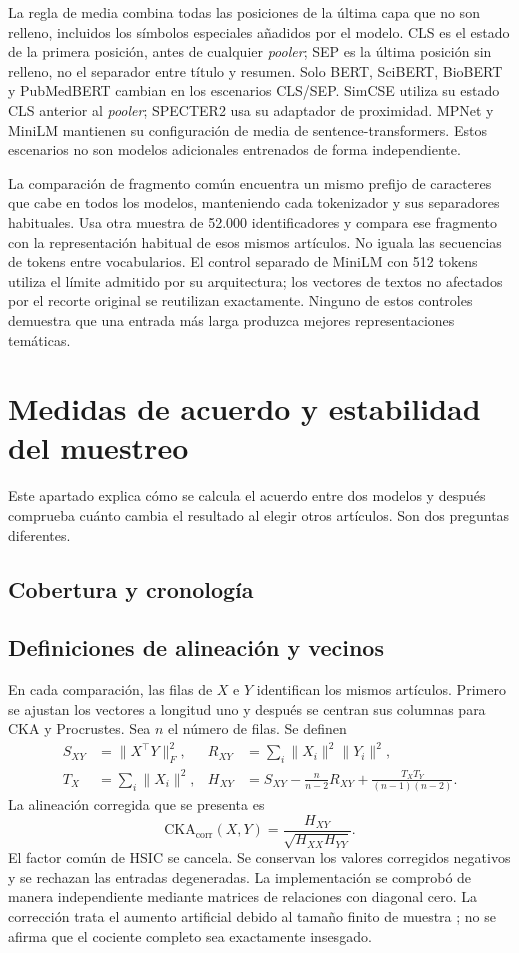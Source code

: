 \documentclass[12pt]{article}
\begin{document}
La regla de media combina todas las posiciones de la última capa que no son relleno, incluidos los símbolos especiales añadidos por el modelo. CLS es el estado de la primera posición, antes de cualquier \emph{pooler}; SEP es la última posición sin relleno, no el separador entre título y resumen. Solo BERT, SciBERT, BioBERT y PubMedBERT cambian en los escenarios CLS/SEP. SimCSE utiliza su estado CLS anterior al \emph{pooler}; SPECTER2 usa su adaptador de proximidad. MPNet y MiniLM mantienen su configuración de media de sentence-transformers. Estos escenarios no son modelos adicionales entrenados de forma independiente.

La comparación de fragmento común encuentra un mismo prefijo de caracteres que cabe en todos los modelos, manteniendo cada tokenizador y sus separadores habituales. Usa otra muestra de 52.000 identificadores y compara ese fragmento con la representación habitual de esos mismos artículos. No iguala las secuencias de tokens entre vocabularios. El control separado de MiniLM con 512 tokens utiliza el límite admitido por su arquitectura; los vectores de textos no afectados por el recorte original se reutilizan exactamente. Ninguno de estos controles demuestra que una entrada más larga produzca mejores representaciones temáticas.
\clearpage

\FloatBarrier

\clearpage
\section{Medidas de acuerdo y estabilidad del muestreo}
Este apartado explica cómo se calcula el acuerdo entre dos modelos y después comprueba cuánto cambia el resultado al elegir otros artículos. Son dos preguntas diferentes.

\subsection{Cobertura y cronología}

\subsection{Definiciones de alineación y vecinos}
En cada comparación, las filas de $X$ e $Y$ identifican los mismos artículos. Primero se ajustan los vectores a longitud uno y después se centran sus columnas para CKA y Procrustes. Sea $n$ el número de filas. Se definen
\begin{align*}
S_{XY}&=\lVert X^\top Y\rVert_F^2, &
R_{XY}&=\sum_i\lVert X_i\rVert^2\lVert Y_i\rVert^2,\\
T_X&=\sum_i\lVert X_i\rVert^2, &
H_{XY}&=S_{XY}-\frac{n}{n-2}R_{XY}
+\frac{T_XT_Y}{(n-1)(n-2)}.
\end{align*}
La alineación corregida que se presenta es
\[
\mathrm{CKA}_{\mathrm{corr}}(X,Y)=\frac{H_{XY}}{\sqrt{H_{XX}H_{YY}}}.
\]
El factor común de HSIC se cancela. Se conservan los valores corregidos negativos y se rechazan las entradas degeneradas. La implementación se comprobó de manera independiente mediante matrices de relaciones con diagonal cero. La corrección trata el aumento artificial debido al tamaño finito de muestra \citep{pmlr-v97-kornblith19a,refa961d84a4e}; no se afirma que el cociente completo sea exactamente insesgado.
\end{document}
